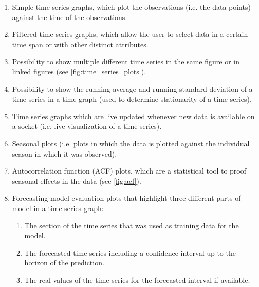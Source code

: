 \documentclass[12pt, a4paper]{article}
\begin{document}
\begin{enumerate}
 \item Simple time series graphs, which plot the observations (i.e. the data points) against the time of the observations.
 \item Filtered time series graphs, which allow the user to select data in a certain time span or with other distinct attributes.
 \item Possibility to show multiple different time series in the same figure or in linked figures (see \autoref{fig:time_series_plots}).
 \item Possibility to show the running average and running standard deviation of a time series in a time graph (used to determine stationarity of a time series).
 \item Time series graphs which are live updated whenever new data is available on a socket (i.e. live visualization of a time series).
 \item Seasonal plots (i.e. plots in which the data is plotted against the individual season in which it was observed).
 \item Autocorrelation function (ACF) plots, which are a statistical tool to proof seasonal effects in the data (see \autoref{fig:acf}).
 \item Forecasting model evaluation plots that highlight three different parts of model in a time series graph:
 \begin{enumerate}
  \item The section of the time series that was used as training data for the model.
  \item The forecasted time series including a confidence interval up to the horizon of the prediction.
  \item The real values of the time series for the forecasted interval if available.
 \end{enumerate}
\end{enumerate}
\end{document}
